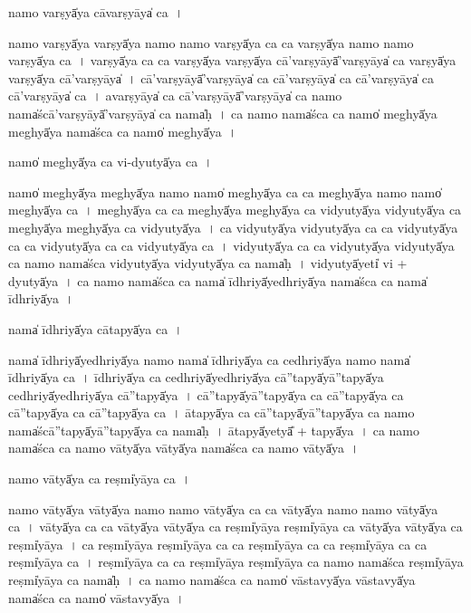 \documentclass[parskip, DIV=14]{scrartcl}
\begin{document}
{namo॒ varṣyā̍ya cāva॒rṣyāya̍ ca॒~।

namo॒ varṣyā̍ya॒ varṣyā̍ya॒ namo॒ namo॒ varṣyā̍ya ca ca॒ varṣyā̍ya॒ namo॒ namo॒ varṣyā̍ya ca~।
varṣyā̍ya ca ca॒ varṣyā̍ya॒ varṣyā̍ya cā'va॒rṣyāyā̍'va॒rṣyāya̍ ca॒ varṣyā̍ya॒ varṣyā̍ya cā'va॒rṣyāya̍~।
cā॒'va॒rṣyāyā̍'va॒rṣyāya̍ ca cā'va॒rṣyāya̍ ca cā'va॒rṣyāya̍ ca cā'va॒rṣyāya̍ ca~।
a॒va॒rṣyāya̍ ca cā'va॒rṣyāyā̍'va॒rṣyāya̍ ca॒ namo॒ nama̍ścā'va॒rṣyāyā̍'va॒rṣyāya̍ ca॒ nama̍ḥ~।
ca॒ namo॒ nama̍śca ca॒ namo̍ me॒ghyā̍ya me॒ghyā̍ya॒ nama̍śca ca॒ namo̍ me॒ghyā̍ya~।

namo̍ me॒ghyā̍ya ca vi-dyu॒tyā̍ya ca॒~।

namo̍ me॒ghyā̍ya me॒ghyā̍ya॒ namo॒ namo̍ me॒ghyā̍ya ca ca me॒ghyā̍ya॒ namo॒ namo̍ me॒ghyā̍ya ca~।
me॒ghyā̍ya ca ca me॒ghyā̍ya me॒ghyā̍ya ca vidyu॒tyā̍ya vidyu॒tyā̍ya ca me॒ghyā̍ya me॒ghyā̍ya ca vidyu॒tyā̍ya~।
ca॒ vi॒dyu॒tyā̍ya vidyu॒tyā̍ya ca ca vidyu॒tyā̍ya ca ca vidyu॒tyā̍ya ca ca vidyu॒tyā̍ya ca~।
vi॒dyu॒tyā̍ya ca ca vidyu॒tyā̍ya vidyu॒tyā̍ya ca॒ namo॒ nama̍śca vidyu॒tyā̍ya vidyu॒tyā̍ya ca॒ nama̍ḥ~।
vi॒dyu॒tyā̍yeti̍ vi + dyu॒tyā̍ya~।
ca॒ namo॒ nama̍śca ca॒ nama̍ ī॒dhriyā̍ye॒dhriyā̍ya॒ nama̍śca ca॒ nama̍ ī॒dhriyā̍ya~।

nama̍ ī॒dhriyā̍ya cāta॒pyā̍ya ca॒~।

nama̍ ī॒dhriyā̍ye॒dhriyā̍ya॒ namo॒ nama̍ ī॒dhriyā̍ya ca ce॒dhriyā̍ya॒ namo॒ nama̍ ī॒dhriyā̍ya ca~।
ī॒dhriyā̍ya ca ce॒dhriyā̍ye॒dhriyā̍ya cā''ta॒pyā̍yā''ta॒pyā̍ya ce॒dhriyā̍ye॒dhriyā̍ya cā''ta॒pyā̍ya~।
cā॒''ta॒pyā̍yā''ta॒pyā̍ya ca cā''ta॒pyā̍ya ca cā''ta॒pyā̍ya ca cā''ta॒pyā̍ya ca~।
ā॒ta॒pyā̍ya ca cā''ta॒pyā̍yā''ta॒pyā̍ya ca॒ namo॒ nama̍ścā''ta॒pyā̍yā''ta॒pyā̍ya ca॒ nama̍ḥ~।
ā॒ta॒pyā̍yetyā̎ + ta॒pyā̍ya~।
ca॒ namo॒ nama̍śca ca॒ namo॒ vātyā̍ya॒ vātyā̍ya॒ nama̍śca ca॒ namo॒ vātyā̍ya~।

namo॒ vātyā̍ya ca॒ reṣmi̍yāya ca॒~।

namo॒ vātyā̍ya॒ vātyā̍ya॒ namo॒ namo॒ vātyā̍ya ca ca॒ vātyā̍ya॒ namo॒ namo॒ vātyā̍ya ca~।
vātyā̍ya ca ca॒ vātyā̍ya॒ vātyā̍ya ca॒ reṣmi̍yāya॒  reṣmi̍yāya ca॒ vātyā̍ya॒ vātyā̍ya ca॒ reṣmi̍yāya~।
ca॒ reṣmi̍yāya॒  reṣmi̍yāya  ca ca॒ reṣmi̍yāya ca ca॒ reṣmi̍yāya  ca ca॒ reṣmi̍yāya ca~।
reṣmi̍yāya  ca ca॒ reṣmi̍yāya॒ reṣmi̍yāya ca॒ namo॒ nama̍śca॒ reṣmi̍yāya॒ reṣmi̍yāya ca॒ nama̍ḥ~।
ca॒ namo॒ nama̍śca ca॒ namo̍ vāsta॒vyā̍ya vāsta॒vyā̍ya॒ nama̍śca ca॒ namo̍ vāsta॒vyā̍ya~।

}
\end{document}
